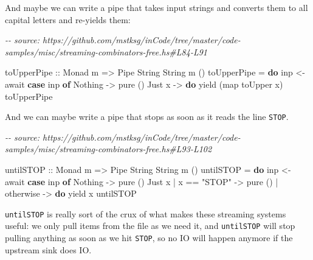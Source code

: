 \documentclass[]{article}
\newenvironment{Shaded}{}{}
\newcommand{\CommentTok}[1]{\textcolor[rgb]{0.38,0.63,0.69}{\textit{#1}}}
\newcommand{\DataTypeTok}[1]{\textcolor[rgb]{0.56,0.13,0.00}{#1}}
\newcommand{\FunctionTok}[1]{\textcolor[rgb]{0.02,0.16,0.49}{#1}}
\newcommand{\KeywordTok}[1]{\textcolor[rgb]{0.00,0.44,0.13}{\textbf{#1}}}
\newcommand{\NormalTok}[1]{#1}
\newcommand{\OperatorTok}[1]{\textcolor[rgb]{0.40,0.40,0.40}{#1}}
\newcommand{\OtherTok}[1]{\textcolor[rgb]{0.00,0.44,0.13}{#1}}
\newcommand{\StringTok}[1]{\textcolor[rgb]{0.25,0.44,0.63}{#1}}
\begin{document}
And maybe we can write a pipe that takes input strings and converts them to all
capital letters and re-yields them:

\begin{Shaded}
\begin{Highlighting}[]
\CommentTok{{-}{-} source: https://github.com/mstksg/inCode/tree/master/code{-}samples/misc/streaming{-}combinators{-}free.hs\#L84{-}L91}

\OtherTok{toUpperPipe ::} \DataTypeTok{Monad}\NormalTok{ m }\OtherTok{=>} \DataTypeTok{Pipe} \DataTypeTok{String} \DataTypeTok{String}\NormalTok{ m ()}
\NormalTok{toUpperPipe }\OtherTok{=} \KeywordTok{do}
\NormalTok{    inp }\OtherTok{<{-}}\NormalTok{ await}
    \KeywordTok{case}\NormalTok{ inp }\KeywordTok{of}
      \DataTypeTok{Nothing} \OtherTok{{-}>} \FunctionTok{pure}\NormalTok{ ()}
      \DataTypeTok{Just}\NormalTok{ x  }\OtherTok{{-}>} \KeywordTok{do}
\NormalTok{        yield (}\FunctionTok{map} \FunctionTok{toUpper}\NormalTok{ x)}
\NormalTok{        toUpperPipe}
\end{Highlighting}
\end{Shaded}

And we can maybe write a pipe that stops as soon as it reads the line
\texttt{STOP}.

\begin{Shaded}
\begin{Highlighting}[]
\CommentTok{{-}{-} source: https://github.com/mstksg/inCode/tree/master/code{-}samples/misc/streaming{-}combinators{-}free.hs\#L93{-}L102}

\OtherTok{untilSTOP ::} \DataTypeTok{Monad}\NormalTok{ m }\OtherTok{=>} \DataTypeTok{Pipe} \DataTypeTok{String} \DataTypeTok{String}\NormalTok{ m ()}
\NormalTok{untilSTOP }\OtherTok{=} \KeywordTok{do}
\NormalTok{    inp }\OtherTok{<{-}}\NormalTok{ await}
    \KeywordTok{case}\NormalTok{ inp }\KeywordTok{of}
      \DataTypeTok{Nothing} \OtherTok{{-}>} \FunctionTok{pure}\NormalTok{ ()}
      \DataTypeTok{Just}\NormalTok{ x}
        \OperatorTok{|}\NormalTok{ x }\OperatorTok{==} \StringTok{"STOP"} \OtherTok{{-}>} \FunctionTok{pure}\NormalTok{ ()}
        \OperatorTok{|} \FunctionTok{otherwise}   \OtherTok{{-}>} \KeywordTok{do}
\NormalTok{            yield x}
\NormalTok{            untilSTOP}
\end{Highlighting}
\end{Shaded}

\texttt{untilSTOP} is really sort of the crux of what makes these streaming
systems useful: we only pull items from the file as we need it, and
\texttt{untilSTOP} will stop pulling anything as soon as we hit \texttt{STOP},
so no IO will happen anymore if the upstream sink does IO.
\end{document}
